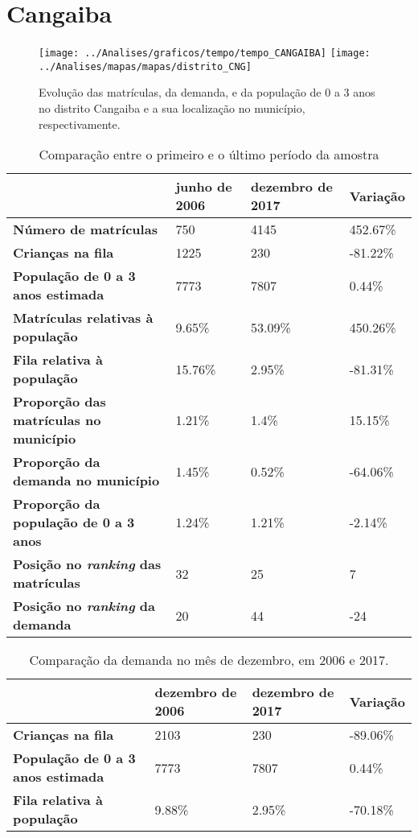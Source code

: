 \section{Cangaiba}
\begin{figure}[H]
	\centering
	\texttt{[image: ../Analises/graficos/tempo/tempo\_CANGAIBA]}
	\texttt{[image: ../Analises/mapas/mapas/distrito\_CNG]}
	\caption{Evolução das matrículas, da demanda, e da população de 0 a 3 anos no distrito Cangaiba e a sua localização no município, respectivamente.}
\end{figure}
\begin{table}[H]
	\begin{tabular}{|l|l|l|l|}
		\hline
		\textbf{}                                      & \textbf{junho de 2006}       & \textbf{dezembro de 2017}    & \textbf{Variação} \\ \hline
		\textbf{Número de matrículas}                  & 750 & 4145 & 452.67\% \\ \hline
		\textbf{Crianças na fila}                      & 1225 & 230 & -81.22\% \\ \hline
		\textbf{População de 0 a 3 anos estimada}      & 7773 & 7807 & 0.44\% \\ \hline
		\textbf{Matrículas relativas à população}      & 9.65\% & 53.09\% & 450.26\% \\ \hline
		\textbf{Fila relativa à população}             & 15.76\% & 2.95\% & -81.31\% \\ \hline
		\textbf{Proporção das matrículas no município} & 1.21\% & 1.4\% & 15.15\% \\ \hline
		\textbf{Proporção da demanda no município}     & 1.45\% & 0.52\% & -64.06\% \\ \hline
		\textbf{Proporção da população de 0 a 3 anos}  & 1.24\% & 1.21\% & -2.14\% \\ \hline
		\textbf{Posição no \textit{ranking} das matrículas}     & 32 & 25 & 7 \\ \hline
		\textbf{Posição no \textit{ranking} da demanda}         & 20 & 44 & -24 \\ \hline
	\end{tabular}
	\caption{Comparação entre o primeiro e o último período da amostra}
\end{table}
\begin{table}[H]
	\begin{tabular}{|l|l|l|l|}
		\hline
		\textbf{}                                 & \textbf{dezembro de 2006} & \textbf{dezembro de 2017} & \textbf{Variação} \\ \hline
		\textbf{Crianças na fila}                      & 2103 & 230 & -89.06\% \\ \hline
		\textbf{População de 0 a 3 anos estimada}      & 7773 & 7807 & 0.44\% \\ \hline
		\textbf{Fila relativa à população}             & 9.88\% & 2.95\% & -70.18\% \\ \hline
	\end{tabular}
	\caption{Comparação da demanda no mês de dezembro, em 2006 e 2017.}
\end{table}
